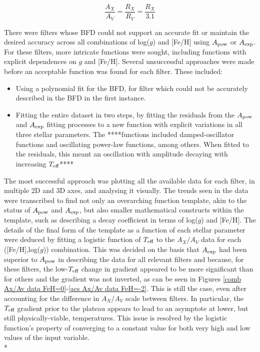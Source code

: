 \documentclass[12pt, a4paper]{report}
\begin{document}
\begin{equation}
\frac{A_{X}}{A_{V}} = \frac{R_{X}}{R_{V}} = \frac{R_{X}}{3.1}
\label{convert_Rx_to_Ax}
\end{equation}

There were filters whose BFD could not support an accurate fit or maintain the desired accuracy across all combinations of log($g$) and [Fe/H] using $A_{\textnormal{pow}}$ or $A_{\textnormal{exp}}$. For these filters, more intricate functions were sought, including functions with explicit dependences on $g$ and [Fe/H]. Several unsuccessful approaches were made before an acceptable function was found for each filter. These included:

\begin{itemize}
\item Using a polynomial fit for the BFD, for filter which could not be accurately described in the BFD in the first instance.
\item Fitting the entire dataset in two steps, by fitting the residuals from the $A_{\textnormal{pow}}$ and $A_{\textnormal{exp}}$ fitting processes to a new function with explicit variations in all three stellar parameters. The ****functions included damped-oscillator functions and oscillating power-law functions, among others. When fitted to the residuals, this meant an oscillation with amplitude decaying with increasing $T_{\textnormal{eff}}$****
\end{itemize}

The most successful approach was plotting all the available data for each filter, in multiple 2D and 3D axes, and analysing it visually. The trends seen in the data were transcribed to find not only an overarching function template, akin to the status of $A_{\textnormal{pow}}$ and $A_{\textnormal{exp}}$, but also smaller mathematical constructs within the template, such as describing a decay coefficient in terms of log($g$) and [Fe/H]. The details of the final form of the template as a function of each stellar parameter were deduced by fitting a logistic function of $T_{\textnormal{eff}}$ to the $A_{X}/A_{V}$ data for each ([Fe/H],log($g$)) combination. This was decided on the basis that $A_{\textnormal{exp}}$ had been superior to $A_{\textnormal{pow}}$ in describing the data for all relevant filters and because, for these filters, the low-$T_{\textnormal{eff}}$ change in gradient appeared to be more significant than for others and the gradient was not inverted, as can be seen in Figures \ref{comb Ax/Av data FeH=0}-\ref{acs Ax/Av data FeH=-2}. This is still the case, even after accounting for the difference in $A_{X}/A_{V}$ scale between filters. In particular, the $T_{\textnormal{eff}}$ gradient prior to the plateau appears to lead to an asymptote at lower, but still physically-viable, temperatures. This issue is resolved by the logistic function's property of converging to a constant value for both very high and low values of the input variable.  \\*
\end{document}

